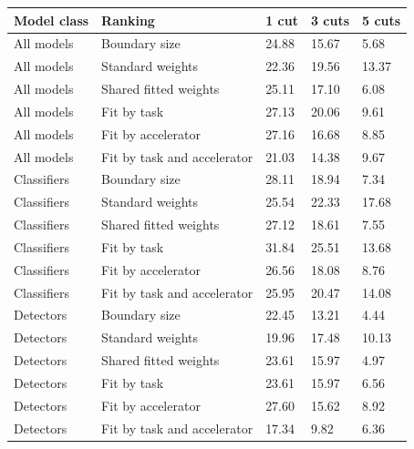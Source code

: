 \begin{tabular}{@{}lllll@{}}
\toprule
Model class & Ranking & 1 cut & 3 cuts & 5 cuts \\
\midrule
All models & Boundary size & 24.88 & 15.67 & 5.68 \\
All models & Standard weights & 22.36 & 19.56 & 13.37 \\
All models & Shared fitted weights & 25.11 & 17.10 & 6.08 \\
All models & Fit by task & 27.13 & 20.06 & 9.61 \\
All models & Fit by accelerator & 27.16 & 16.68 & 8.85 \\
All models & Fit by task and accelerator & 21.03 & 14.38 & 9.67 \\
Classifiers & Boundary size & 28.11 & 18.94 & 7.34 \\
Classifiers & Standard weights & 25.54 & 22.33 & 17.68 \\
Classifiers & Shared fitted weights & 27.12 & 18.61 & 7.55 \\
Classifiers & Fit by task & 31.84 & 25.51 & 13.68 \\
Classifiers & Fit by accelerator & 26.56 & 18.08 & 8.76 \\
Classifiers & Fit by task and accelerator & 25.95 & 20.47 & 14.08 \\
Detectors & Boundary size & 22.45 & 13.21 & 4.44 \\
Detectors & Standard weights & 19.96 & 17.48 & 10.13 \\
Detectors & Shared fitted weights & 23.61 & 15.97 & 4.97 \\
Detectors & Fit by task & 23.61 & 15.97 & 6.56 \\
Detectors & Fit by accelerator & 27.60 & 15.62 & 8.92 \\
Detectors & Fit by task and accelerator & 17.34 & 9.82 & 6.36 \\
\bottomrule
\end{tabular}
